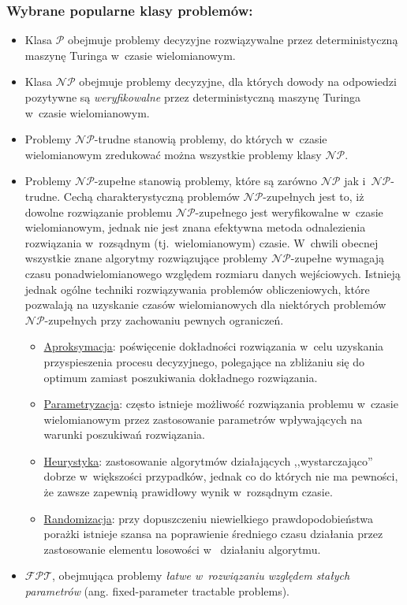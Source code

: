 \subsubsection{Wybrane popularne klasy problemów:}
\label{sss_popular_cplx_classes}
\par{
\begin{itemize}
  \item Klasa $\mathcal{P}$ obejmuje problemy decyzyjne rozwiązywalne przez
    deterministyczną maszynę Turinga w~czasie wielomianowym.
  \item Klasa $\mathcal{NP}$ obejmuje problemy decyzyjne, dla których dowody na 
    odpowiedzi pozytywne są \emph{weryfikowalne} przez deterministyczną maszynę
    Turinga w~czasie wielomianowym.
  \item Problemy $\mathcal{NP}$-trudne stanowią problemy, do których w~czasie
    wielomianowym zredukować można wszystkie problemy klasy $\mathcal{NP}$.
  \item Problemy $\mathcal{NP}$-zupełne stanowią problemy, które są zarówno
    $\mathcal{NP}$ jak i~$\mathcal{NP}$-trudne.
    Cechą charakterystyczną problemów $\mathcal{NP}$-zupełnych jest to, iż
    dowolne rozwiązanie problemu $\mathcal{NP}$-zupełnego jest weryfikowalne
    w~czasie wielomianowym, jednak nie jest znana efektywna metoda odnalezienia
    rozwiązania w~rozsądnym (tj.\ wielomianowym) czasie. 
    W~chwili obecnej wszystkie znane algorytmy rozwiązujące problemy 
    $\mathcal{NP}$-zupełne wymagają czasu ponadwielomianowego względem rozmiaru
    danych wejściowych.
    Istnieją jednak ogólne techniki rozwiązywania problemów obliczeniowych,
    które pozwalają na uzyskanie czasów wielomianowych dla niektórych problemów
    $\mathcal{NP}$-zupełnych przy zachowaniu pewnych ograniczeń.
    \begin{itemize}
      \item \underline{Aproksymacja}: poświęcenie dokładności rozwiązania
        w~celu uzyskania przyspieszenia procesu decyzyjnego, polegające na zbliżaniu się do
        optimum zamiast poszukiwania dokładnego rozwiązania.
      \item \underline{Parametryzacja}: często istnieje możliwość rozwiązania
        problemu w~czasie wielomianowym przez zastosowanie parametrów wpływających na warunki
        poszukiwań rozwiązania.
      \item \underline{Heurystyka}: zastosowanie algorytmów działających
        ,,wystarczająco'' dobrze w~większości przypadków, jednak co do których
        nie ma pewności, że zawsze zapewnią prawidłowy wynik w~rozsądnym czasie.
      \item \underline{Randomizacja}: przy dopuszczeniu niewielkiego
        prawdopodobieństwa porażki istnieje szansa na poprawienie
        średniego czasu działania przez zastosowanie elementu losowości w~        działaniu algorytmu.
    \end{itemize}
  \item $\mathcal{FPT}$, obejmująca problemy \emph{łatwe w~rozwiązaniu względem stałych parametrów} (ang. fixed-parameter tractable problems).
\end{itemize}

}
